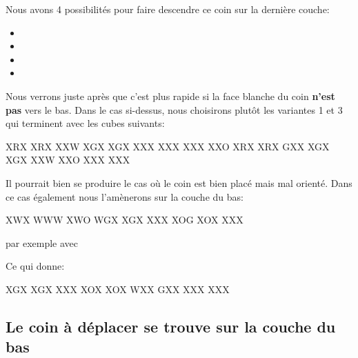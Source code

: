 \documentclass[10pt,paper=a5,pagesize]{scrbook}
\begin{document}
Nous avons 4 possibilités pour faire descendre ce coin sur la dernière couche:

\begin{itemize}
	\item {}
	\item {}
	\item {}
	\item {}		
\end{itemize}

Nous verrons juste après que c'est plus rapide si la face blanche du coin \textbf{n'est pas} vers le bas. Dans le cas si-dessus, nous choisirons plutôt les variantes 1 et 3 qui terminent avec les cubes suivants:

\begin{center}
	
	\RubikFaceRight%
	{X}{R}{X}%
	{X}{R}{X}%
	{X}{X}{W}
	\RubikFaceFront%
	{X}{G}{X}%
	{X}{G}{X}%
	{X}{X}{X}
		\RubikFaceDown%
		{X}{X}{X}%
		{X}{X}{X}%
		{X}{X}{O}
	\hspace*{1cm} 	
	\RubikFaceRight%
	{X}{R}{X}%
	{X}{R}{X}%
	{G}{X}{X}
	\RubikFaceFront%
	{X}{G}{X}%
	{X}{G}{X}%
	{X}{X}{W}
	\RubikFaceDown%
	{X}{X}{O}%
	{X}{X}{X}%
	{X}{X}{X}
\end{center} 

Il pourrait bien se produire le cas où le coin est bien placé mais mal orienté. Dans ce cas également nous l'amènerons sur la couche du bas:

\begin{center}
	\RubikFaceUp%
	{X}{W}{X}%
	{W}{W}{W}%
	{X}{W}{O}
	\RubikFaceRight%
	{W}{G}{X}%
	{X}{G}{X}%
	{X}{X}{X}
	\RubikFaceFront%
	{X}{O}{G}%
	{X}{O}{X}%
	{X}{X}{X}
\end{center}
 
 par exemple avec 
 
Ce qui donne:
 
\begin{center}
    \RubikFaceRight%
 	{X}{G}{X}%
 	{X}{G}{X}%
 	{X}{X}{X}
 	\RubikFaceFront%
 	{X}{O}{X}%
 	{X}{O}{X}%
 	{W}{X}{X}
 	\RubikFaceDown%
 	{G}{X}{X}%
 	{X}{X}{X}%
 	{X}{X}{X}
\end{center} 

\subsection{Le coin à déplacer se trouve sur la couche du bas}
\end{document}

